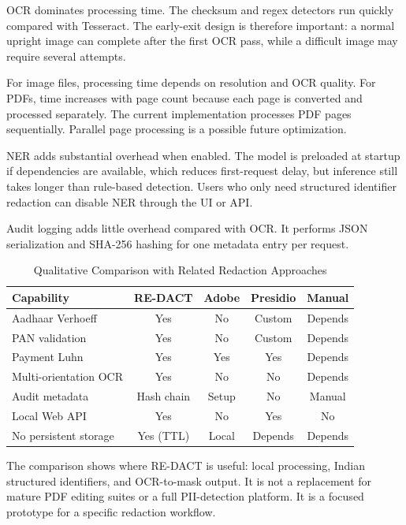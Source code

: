OCR dominates processing time. The checksum and regex detectors run quickly compared with Tesseract. The early-exit design is therefore important: a normal upright image can complete after the first OCR pass, while a difficult image may require several attempts.

For image files, processing time depends on resolution and OCR quality. For PDFs, time increases with page count because each page is converted and processed separately. The current implementation processes PDF pages sequentially. Parallel page processing is a possible future optimization.

NER adds substantial overhead when enabled. The model is preloaded at startup if dependencies are available, which reduces first-request delay, but inference still takes longer than rule-based detection. Users who only need structured identifier redaction can disable NER through the UI or API.

Audit logging adds little overhead compared with OCR. It performs JSON serialization and SHA-256 hashing for one metadata entry per request.

\begin{table}[htbp]
\caption{Qualitative Comparison with Related Redaction Approaches}
\label{tab:feature_comparison}
\centering
\begin{tabular}{|l|c|c|c|c|}
\hline
\textbf{Capability} & \textbf{RE-DACT} & \textbf{Adobe} & \textbf{Presidio} & \textbf{Manual} \\
\hline
Aadhaar Verhoeff & Yes & No & Custom & Depends \\
\hline
PAN validation & Yes & No & Custom & Depends \\
\hline
Payment Luhn & Yes & Yes & Yes & Depends \\
\hline
Multi-orientation OCR & Yes & No & No & Depends \\
\hline
Audit metadata & Hash chain & Setup & No & Manual \\
\hline
Local Web API & Yes & No & Yes & No \\
\hline
No persistent storage & Yes (TTL) & Local & Depends & Depends \\
\hline
\end{tabular}
\end{table}

The comparison shows where RE-DACT is useful: local processing, Indian structured identifiers, and OCR-to-mask output. It is not a replacement for mature PDF editing suites or a full PII-detection platform. It is a focused prototype for a specific redaction workflow.

